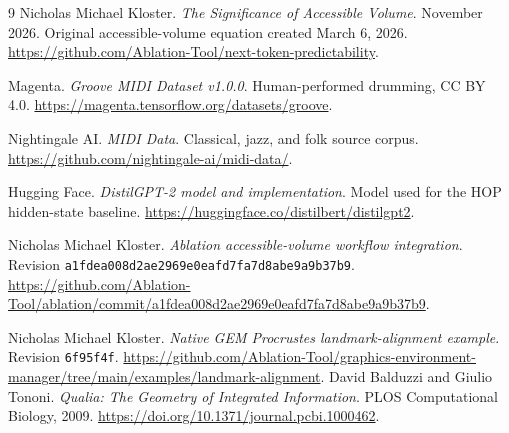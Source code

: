 \documentclass[11pt,a4paper]{article}
\begin{document}
\clearpage
\begin{thebibliography}{9}
Nicholas Michael Kloster.
\newblock \emph{The Significance of Accessible Volume}.
\newblock November 2026. Original accessible-volume equation created March 6, 2026.
\newblock \url{https://github.com/Ablation-Tool/next-token-predictability}.

Magenta.
\newblock \emph{Groove MIDI Dataset v1.0.0}.
\newblock Human-performed drumming, CC BY 4.0.
\newblock \url{https://magenta.tensorflow.org/datasets/groove}.

Nightingale AI.
\newblock \emph{MIDI Data}.
\newblock Classical, jazz, and folk source corpus.
\newblock \url{https://github.com/nightingale-ai/midi-data/}.

Hugging Face.
\newblock \emph{DistilGPT-2 model and implementation}.
\newblock Model used for the HOP hidden-state baseline.
\newblock \url{https://huggingface.co/distilbert/distilgpt2}.

Nicholas Michael Kloster.
\newblock \emph{Ablation accessible-volume workflow integration}.
\newblock Revision \texttt{a1fdea008d2ae2969e0eafd7fa7d8abe9a9b37b9}.
\newblock \url{https://github.com/Ablation-Tool/ablation/commit/a1fdea008d2ae2969e0eafd7fa7d8abe9a9b37b9}.

Nicholas Michael Kloster.
\newblock \emph{Native GEM Procrustes landmark-alignment example}.
\newblock Revision \texttt{6f95f4f}.
\newblock \url{https://github.com/Ablation-Tool/graphics-environment-manager/tree/main/examples/landmark-alignment}.
David Balduzzi and Giulio Tononi.
\newblock \emph{Qualia: The Geometry of Integrated Information}.
\newblock PLOS Computational Biology, 2009.
\newblock \url{https://doi.org/10.1371/journal.pcbi.1000462}.
\end{thebibliography}
\end{document}
